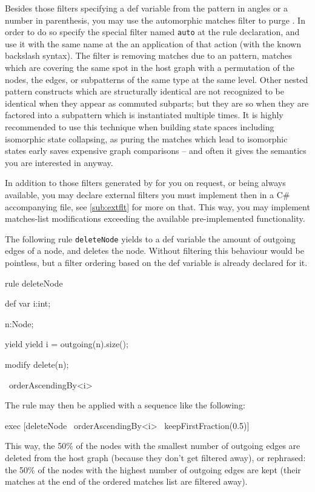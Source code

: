 Besides those filters specifying a def variable from the pattern in angles or a number in parenthesis, you may use the automorphic matches filter to purge .
In order to do so specify the special filter named \texttt{auto} at the rule declaration, and use it with the same name at the an application of that action (with the known backslash syntax).
The filter is removing matches due to an  pattern, matches which are covering the same spot in the host graph with a permutation of the nodes, the edges, or subpatterns of the same type at the same level.
Other nested pattern constructs which are structurally identical are not recognized to be identical when they appear as commuted subparts; but they are so when they are factored into a subpattern which is instantiated multiple times.
It is highly recommended to use this  technique when building state spaces including isomorphic state collapsing, as puring the matches which lead to isomorphic states early saves expensive graph comparisons -- and often it gives the semantics you are interested in anyway.

In addition to those filters generated by \GrG{ }for you on request, or being always available, you may declare external filters you must implement then in a C\# accompanying file, see \ref{sub:extflt} for more on that.
This way, you may implement matches-list modifications exceeding the available pre-implemented functionality.

\begin{example}
The following rule \texttt{deleteNode} yields to a def variable the amount of outgoing edges of a node, and deletes the node.
Without filtering this behaviour would be pointless, but a filter ordering based on the def variable is already declared for it.
\begin{grgen}
rule deleteNode
{
	def var i:int;

	n:Node;

	yield {
		yield i = outgoing(n).size();
	}
	
	modify{
		delete(n);
	}
} \ orderAscendingBy<i>
\end{grgen}
The rule may then be applied with a sequence like the following:
\begin{grshell}
  exec [deleteNode \ orderAscendingBy<i> \ keepFirstFraction(0.5)]
\end{grshell}
This way, the 50\% of the nodes with the smallest number of outgoing edges are deleted from the host graph (because they don't get filtered away), or rephrased: the 50\% of the nodes with the highest number of outgoing edges are kept (their matches at the end of the ordered matches list are filtered away).
\end{example}
	
